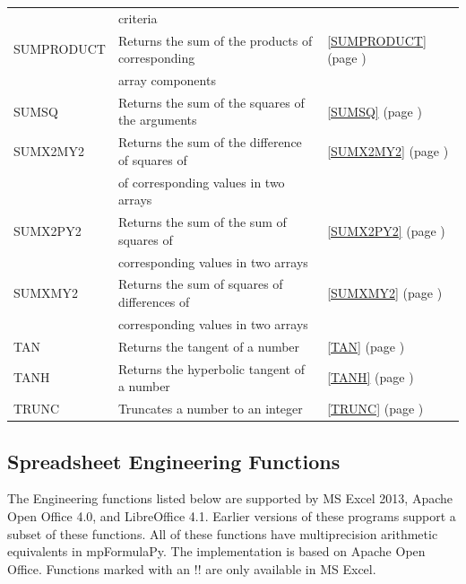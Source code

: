 \begin{center}
\begin{longtable}{l l l }
		& criteria &   \\						
		SUMPRODUCT & Returns the sum of the products of corresponding  &  \ref{SUMPRODUCT} (page \pageref{SUMPRODUCT}) \index{Spreadsheet Functions!SUMPRODUCT} \\
		& array components &   \\
		SUMSQ & Returns the sum of the squares of the arguments &  \ref{SUMSQ} (page \pageref{SUMSQ}) \index{Spreadsheet Functions!SUMSQ} \\
		SUMX2MY2 & Returns the sum of the difference of squares of &  \ref{SUMX2MY2} (page \pageref{SUMX2MY2}) \index{Spreadsheet Functions!SUMX2MY2} \\
		& of corresponding values in two arrays &   \\
		SUMX2PY2 & Returns the sum of the sum of squares of &  \ref{SUMX2PY2} (page \pageref{SUMX2PY2}) \index{Spreadsheet Functions!SUMX2PY2} \\
		& corresponding values in two arrays &  \\
		SUMXMY2 & Returns the sum of squares of differences of &  \ref{SUMXMY2} (page \pageref{SUMXMY2}) \index{Spreadsheet Functions!SUMXMY2} \\
		& corresponding values in two arrays &   \\
		TAN   & Returns the tangent of a number &  \ref{TAN} (page \pageref{TAN}) \index{Spreadsheet Functions!TAN} \\
		TANH  & Returns the hyperbolic tangent of a number &  \ref{TANH} (page \pageref{TANH}) \index{Spreadsheet Functions!TANH} \\
		TRUNC & Truncates a number to an integer &  \ref{TRUNC} (page \pageref{TRUNC}) \index{Spreadsheet Functions!TRUNC} \\							
	\end{longtable}
\end{center}




\newpage 
\subsection{Spreadsheet Engineering Functions}
The Engineering functions listed below are supported by MS Excel 2013, Apache Open Office 4.0, and LibreOffice 4.1. Earlier versions of these programs support a subset of these functions.
All of these functions have multiprecision arithmetic equivalents in mpFormulaPy. The implementation is based on Apache Open Office. Functions marked with an !!
are only available in MS Excel.




